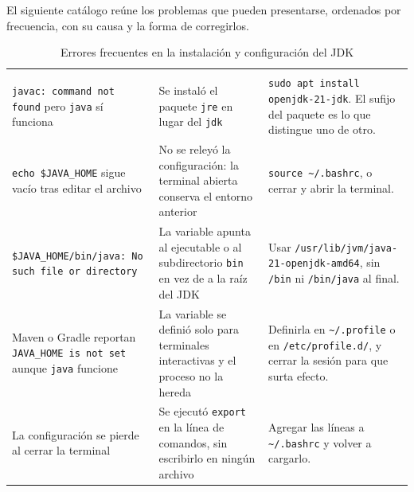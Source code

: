 El siguiente catálogo reúne los problemas que pueden presentarse, ordenados por
frecuencia, con su causa y la forma de corregirlos.

\footnotesize
\renewcommand{\arraystretch}{1.15}
\setlength{\tabcolsep}{4pt}

\begin{longtable}{|>{\raggedright\arraybackslash}p{4.1cm}|>{\raggedright\arraybackslash}p{4.6cm}|>{\raggedright\arraybackslash}p{5.5cm}|}
	\caption{Errores frecuentes en la instalación y configuración del JDK}
	\label{tab:errores} \\
	\hline
	\rowcolor{headerblue}
	\headercell{Síntoma} & \headercell{Causa} & \headercell{Solución} \\
	\hline
	\endfirsthead
	\hline
	\rowcolor{headerblue}
	\headercell{Síntoma} & \headercell{Causa} & \headercell{Solución} \\
	\hline
	\endhead

	\texttt{javac: command not found} pero \texttt{java} sí funciona & Se instaló el
	paquete \texttt{jre} en lugar del \texttt{jdk} & \texttt{sudo apt install
	openjdk-21-jdk}. El sufijo del paquete es lo que distingue uno de otro. \\ \hline

	\texttt{echo \$JAVA\_HOME} sigue vacío tras editar el archivo & No se releyó la
	configuración: la terminal abierta conserva el entorno anterior & \texttt{source
	\textasciitilde/.bashrc}, o cerrar y abrir la terminal. \\ \hline

	\texttt{\$JAVA\_HOME/bin/java: No such file or directory} & La variable apunta al
	ejecutable o al subdirectorio \texttt{bin} en vez de a la raíz del JDK & Usar
	\texttt{/usr/lib/\allowbreak jvm/\allowbreak java-21-\allowbreak openjdk-amd64}, sin \texttt{/bin} ni \texttt{/bin/java}
	al final. \\ \hline

	Maven o Gradle reportan \texttt{JAVA\_HOME is not set} aunque \texttt{java} funcione
	& La variable se definió solo para terminales interactivas y el proceso no la hereda
	& Definirla en \texttt{\textasciitilde/.profile} o en \texttt{/etc/profile.d/}, y
	cerrar la sesión para que surta efecto. \\ \hline

	La configuración se pierde al cerrar la terminal & Se ejecutó \texttt{export} en la
	línea de comandos, sin escribirlo en ningún archivo & Agregar las líneas a
	\texttt{\textasciitilde/.bashrc} y volver a cargarlo. \\ \hline


\end{longtable}
